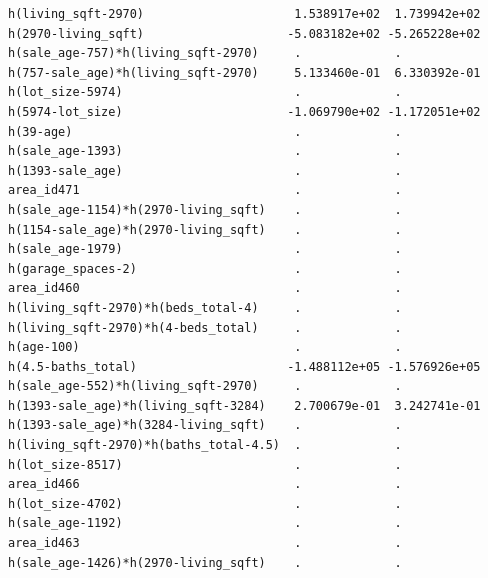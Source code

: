 \documentclass[
]{article}
\begin{document}
\begin{verbatim}
h(living_sqft-2970)                     1.538917e+02  1.739942e+02
h(2970-living_sqft)                    -5.083182e+02 -5.265228e+02
h(sale_age-757)*h(living_sqft-2970)     .             .           
h(757-sale_age)*h(living_sqft-2970)     5.133460e-01  6.330392e-01
h(lot_size-5974)                        .             .           
h(5974-lot_size)                       -1.069790e+02 -1.172051e+02
h(39-age)                               .             .           
h(sale_age-1393)                        .             .           
h(1393-sale_age)                        .             .           
area_id471                              .             .           
h(sale_age-1154)*h(2970-living_sqft)    .             .           
h(1154-sale_age)*h(2970-living_sqft)    .             .           
h(sale_age-1979)                        .             .           
h(garage_spaces-2)                      .             .           
area_id460                              .             .           
h(living_sqft-2970)*h(beds_total-4)     .             .           
h(living_sqft-2970)*h(4-beds_total)     .             .           
h(age-100)                              .             .           
h(4.5-baths_total)                     -1.488112e+05 -1.576926e+05
h(sale_age-552)*h(living_sqft-2970)     .             .           
h(1393-sale_age)*h(living_sqft-3284)    2.700679e-01  3.242741e-01
h(1393-sale_age)*h(3284-living_sqft)    .             .           
h(living_sqft-2970)*h(baths_total-4.5)  .             .           
h(lot_size-8517)                        .             .           
area_id466                              .             .           
h(lot_size-4702)                        .             .           
h(sale_age-1192)                        .             .           
area_id463                              .             .           
h(sale_age-1426)*h(2970-living_sqft)    .             .           
                                                                  

\end{verbatim}
\end{document}
